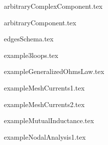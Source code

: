 \begin{frame}{arbitraryComplexComponent.tex}
\begin{center}

\end{center}
\end{frame}

\begin{frame}{arbitraryComponent.tex}
\begin{center}

\end{center}
\end{frame}

\begin{frame}{edgesSchema.tex}
\begin{center}

\end{center}
\end{frame}

\begin{frame}{example3loops.tex}
\begin{center}

\end{center}
\end{frame}

\begin{frame}{exampleGeneralizedOhmsLaw.tex}
\begin{center}

\end{center}
\end{frame}

\begin{frame}{exampleMeshCurrents1.tex}
\begin{center}

\end{center}
\end{frame}

\begin{frame}{exampleMeshCurrents2.tex}
\begin{center}

\end{center}
\end{frame}

\begin{frame}{exampleMutualInductance.tex}
\begin{center}

\end{center}
\end{frame}

\begin{frame}{exampleNodalAnalysis1.tex}
\begin{center}

\end{center}
\end{frame}

